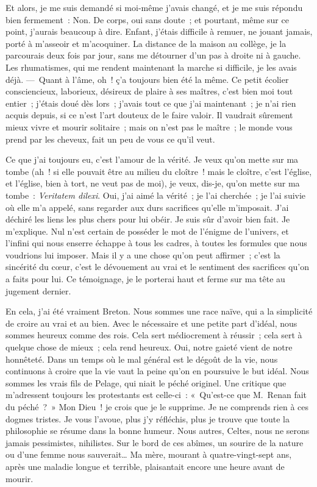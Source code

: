 \documentclass[french,twoside]{book} %
\newcommand\foreign[1]{\emph{#1}}
\newcommand\persName[1]{#1}
\begin{document}
Et alors, je me suis demandé si moi-même j’avais changé, et je me suis répondu bien fermement : Non. De corps, oui sans doute ; et pourtant, même sur ce point, j’aurais beaucoup à dire. Enfant, j’étais difficile à remuer, ne jouant jamais, porté à m’asseoir et m’acoquiner. La distance de la maison au collège, je la parcourais deux fois par jour, sans me détourner d’un pas à droite ni à gauche. Les rhumatismes, qui me rendent maintenant la marche si difficile, je les avais déjà. — Quant à l’âme, oh ! ç’a toujours bien été la même. Ce petit écolier consciencieux, laborieux, désireux de plaire à ses maîtres, c’est bien moi tout entier ; j’étais doué dès lors ; j’avais tout ce que j’ai maintenant ; je n’ai rien acquis depuis, si ce n’est l’art douteux de le faire valoir. Il vaudrait sûrement mieux vivre et mourir solitaire ; mais on n’est pas le maître ; le monde vous prend par les cheveux, fait un peu de vous ce qu’il veut.\par
Ce que j’ai toujours eu, c’est l’amour de la vérité. Je veux qu’on mette sur ma tombe (ah ! si elle pouvait être au milieu du cloître ! mais le cloître, c’est l’église, et l’église, bien à tort, ne veut pas de moi), je veux, dis-je, qu’on mette sur ma tombe : \foreign{{\itshape Veritatem dilexi}}. Oui, j’ai aimé la vérité ; je l’ai cherchée ; je l’ai suivie où elle m’a appelé, sans regarder aux durs sacrifices qu’elle m’imposait. J’ai déchiré les liens les plus chers pour lui obéir. Je suis sûr d’avoir bien fait. Je m’explique. Nul n’est certain de posséder le mot de l’énigme de l’univers, et l’infini qui nous enserre échappe à tous les cadres, à toutes les formules que nous voudrions lui imposer. Mais il y a une chose qu’on peut affirmer ; c’est la sincérité du cœur, c’est le dévouement au vrai et le sentiment des sacrifices qu’on a faits pour lui. Ce témoignage, je le porterai haut et ferme sur ma tête au jugement dernier.\par
En cela, j’ai été vraiment Breton. Nous sommes une race naïve, qui a la simplicité de croire au vrai et au bien. Avec le nécessaire et une petite part d’idéal, nous sommes heureux comme des rois. Cela sert médiocrement à réussir ; cela sert à quelque chose de mieux ; cela rend heureux. Oui, notre gaieté vient de notre honnêteté. Dans un temps où le mal général est le dégoût de la vie, nous continuons à croire que la vie vaut la peine qu’on en poursuive le but idéal. Nous sommes les vrais fils de {\persName Pelage}, qui niait le péché originel. Une critique que m’adressent toujours les protestants est celle-ci : « Qu’est-ce que {\persName M. Renan} fait du péché ? » Mon Dieu ! je crois que je le supprime. Je ne comprends rien à ces dogmes tristes. Je vous l’avoue, plus j’y réfléchis, plus je trouve que toute la philosophie se résume dans la bonne humeur. Nous autres, Celtes, nous ne serons jamais pessimistes, nihilistes. Sur le bord de ces abîmes, un sourire de la nature ou d’une femme nous sauverait… Ma mère, mourant à quatre-vingt-sept ans, après une maladie longue et terrible, plaisantait encore une heure avant de mourir.\par
\end{document}
